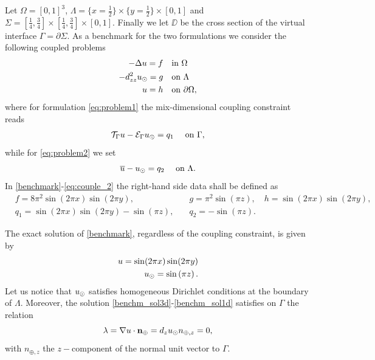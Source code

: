 \documentclass[r]{siamart171218}
\begin{document}
Let $\Omega=[0,1]^3$, $\Lambda=\{x=\tfrac{1}{2}\}\times \{y=\tfrac{1}{2}\} \times [0,1] $
and $\Sigma=[\tfrac{1}{4}, \tfrac{3}{4}]\times [\tfrac{1}{4}, \tfrac{3}{4}]\times [0, 1]$.
Finally we let $\DD$ be the cross section of the virtual interface $\Gamma=\partial \Sigma$.
As a benchmark for the two formulations we consider the following coupled problems
%
\begin{subequations}\label{benchmark}
\begin{align}
\label{benchm_3d}
-\Delta u=f \quad &\text{in $\Omega$}\\
\label{benchm_1d}
-d_{zz}^2 \ud =g \quad &\text{on $\Lambda$}\\
u=h \quad &\text{on $\partial \Omega$},
\end{align}
\end{subequations}
where for formulation \eqref{eq:problem1} the mix-dimensional coupling constraint reads
\begin{equation}
  \label{eq:couple_1}
\mathcal{T}_{\Gamma}u - \mathcal{E}_{\Gamma}\ud = q_1\quad\text{ on }\Gamma,
\end{equation}
while for \eqref{eq:problem2} we set
\begin{equation}
    \label{eq:couple_2}
\avrc{u} - \ud = q_2\quad\text{ on }\Lambda.
\end{equation}
%
In \eqref{benchmark}-\eqref{eq:couple_2} the right-hand side data shall be defined as 
\begin{eqnarray*}
  &f=8\pi ^2 \sin (2\pi x) \sin (2\pi y),\quad &g={\pi ^2}\sin \left({\pi z}\right),\quad h=\sin (2\pi x) \sin (2\pi y),\\
  &q_1=\sin (2\pi x) \sin (2\pi y) - \sin \left({\pi z}\right),\quad &q_2=-\sin \left({\pi z}\right).
\end{eqnarray*}

The exact solution of \eqref{benchmark}, regardless of the coupling constraint,
is given by
%
\begin{eqnarray}
\label{benchm_sol3d}
u=\sin (2\pi x) \sin (2\pi y)\\
\label{benchm_sol1d}
\ud=\sin \left({\pi z}\right).
\end{eqnarray}
%
Let us notice that $u_{\odot}$ satisfies homogeneous Dirichlet conditions at the boundary of $\Lambda$.
Moreover, the solution \eqref{benchm_sol3d}-\eqref{benchm_sol1d} satisfies on $\Gamma$ the relation
\begin{equation}\label{benchm_flux}
\lambda=\nabla u \cdot \textbf{n}_{\oplus}=d_z \ud n_{\oplus,z}=0,
\end{equation}
with $n_{\oplus,z}$ the $z-$component of the normal unit vector to $\Gamma$.
\end{document}
